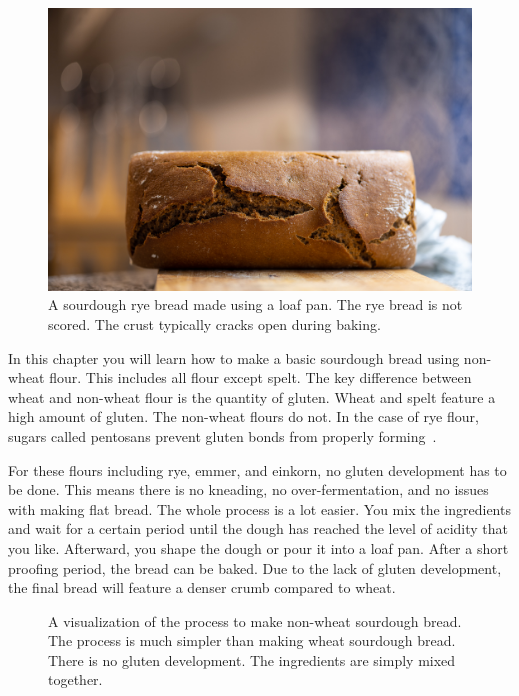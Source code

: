 \begin{figure}[!htb]
  \includegraphics[width=\textwidth]{final-bread}
  \caption{A sourdough rye bread made using a loaf pan. The
  rye bread is not scored. The crust typically cracks
  open during baking.}%
  \label{fig:non-wheat-final-bread}
\end{figure}

In this chapter you will learn how to make a basic sourdough bread
using non-wheat flour. This includes all flour except spelt.
The key difference between wheat and non-wheat flour is
the quantity of gluten. Wheat and spelt feature a high amount
of gluten. The non-wheat flours do not. In the case of rye flour,
sugars called pentosans prevent gluten bonds from properly
forming~\cite{rye+pentosans}.

For these flours including rye, emmer, and einkorn, no gluten
development has to be done. This means there is no kneading,
no over-fermentation, and no issues with making flat bread.
The whole process
is a lot easier. You mix the ingredients and
wait for a certain period until the dough has
reached the level of acidity that you like. Afterward, you
shape the dough or pour it into a loaf pan. After a short proofing
period, the bread can be baked. Due to the lack
of gluten development, the final bread will feature a denser
crumb compared to wheat.

\begin{figure}[!htb]
\begin{center}
  
  \caption{A visualization of the process to make non-wheat sourdough bread.
  The process is much simpler than making wheat sourdough bread. There is
  no gluten development. The ingredients are simply mixed together.}%
  \label{fig:non-wheat-sourdough}
\end{center}
\end{figure}

